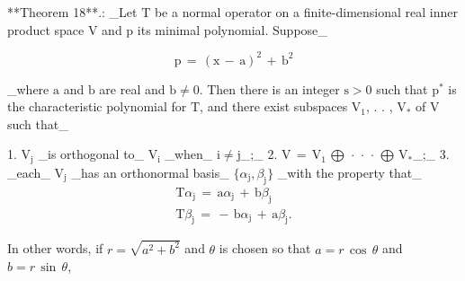 

**Theorem 18**.: _Let \(\mathrm{T}\) be a normal operator on a finite-dimensional real inner product space \(\mathrm{V}\) and \(\mathrm{p}\) its minimal polynomial. Suppose_

\[\mathrm{p}\,=\,(\mathrm{x}\,-\,\mathrm{a})^{2}\,+\,\mathrm{b}^{2}\]

_where \(\mathrm{a}\) and \(\mathrm{b}\) are real and \(\mathrm{b}\neq 0\). Then there is an integer \(\mathrm{s}>0\) such that \(\mathrm{p}^{\ast}\) is the characteristic polynomial for \(\mathrm{T}\), and there exist subspaces \(\mathrm{V}_{\mathrm{1}}\), . . , \(\mathrm{V}_{\ast}\) of \(\mathrm{V}\) such that_

1. \(\mathrm{V}_{\mathrm{j}}\) _is orthogonal to_ \(\mathrm{V}_{\mathrm{i}}\) _when_ \(\mathrm{i}\neq\mathrm{j}\)_;_
2. \(\mathrm{V}\,=\,\mathrm{V}_{\mathrm{1}}\,\bigoplus\,\cdot\,\cdot\,\cdot\, \bigoplus\,\mathrm{V}_{\ast}\)_;_
3. _each_ \(\mathrm{V}_{\mathrm{j}}\) _has an orthonormal basis_ \(\{\alpha_{\mathrm{j}},\beta_{\mathrm{j}}\}\) _with the property that_ \[\begin{array}{l}\mathrm{T}\alpha_{\mathrm{j}}\,=\,\mathrm{a}\alpha_{\mathrm{ j}}\,+\,\mathrm{b}\beta_{\mathrm{j}}\\ \mathrm{T}\beta_{\mathrm{j}}\,=\,-\,\mathrm{b}\alpha_{\mathrm{j}}\,+\,\mathrm{ a}\beta_{\mathrm{j}}.\end{array}\]

In other words, if \(r=\sqrt{a^{2}+b^{2}}\) and \(\theta\) is chosen so that \(a=r\,\cos\,\theta\) and \(b=r\,\sin\,\theta\),